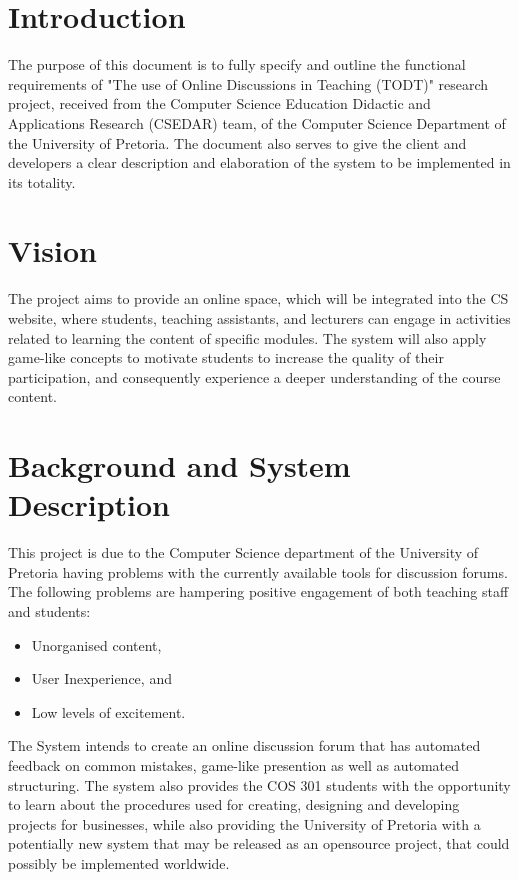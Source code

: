 \documentclass[11pt]{article}
\begin{document}


\tableofcontents	%
\newpage


\section{Introduction}

The purpose of this document is to fully specify and outline the functional requirements of "The use of Online Discussions in Teaching (TODT)" research project, received from the Computer Science Education Didactic and Applications Research (CSEDAR) team, of the Computer Science Department of the University of Pretoria. The document also serves to give the client and developers a clear description and elaboration of the system to be implemented in its totality.

\section{Vision}

The project aims to provide an online space, which will be integrated into the CS website, where students, teaching assistants, and lecturers can engage in activities related to learning the content of specific modules. The system will also apply game-like concepts to motivate students to increase the quality of their participation, and consequently experience a deeper understanding of the course content.

\section{Background and System Description}

This project is due to the Computer Science department of the University of Pretoria having problems with the currently available tools for discussion forums. The following problems are hampering positive engagement of both teaching staff and students:
\begin{itemize}
\item Unorganised content,
\item User Inexperience, and 
\item Low levels of excitement.
\end{itemize}
The System intends to create an online discussion forum that has automated feedback on common mistakes, game-like presention as well as automated structuring. \newline
The system also provides the COS 301 students with the opportunity to learn about the procedures used for creating, designing and developing projects for businesses, while also providing the University of Pretoria with a potentially new system that may be released as an opensource project, that could possibly be implemented worldwide.
\end{document}
